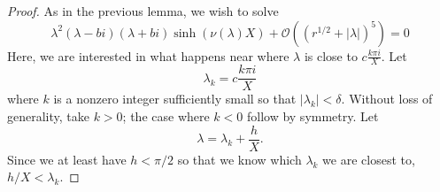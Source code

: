 \documentclass[thesis.tex]{subfiles}
\begin{document}
\begin{lemma}
\begin{proof}
As in the previous lemma, we wish to solve
\begin{equation*}
\lambda^2 ( \lambda - b i) (\lambda + b i)\sinh(\nu(\lambda)X) + \mathcal{O}( (r^{1/2} + |\lambda|)^5 ) = 0
\end{equation*}
Here, we are interested in what happens near where $\lambda$ is close to $c \frac{k \pi i}{X}$. Let 
\[
\lambda_k = c \frac{k \pi i}{X}
\]
where $k$ is a nonzero integer sufficiently small so that $|\lambda_k| < \delta$. Without loss of generality, take $k > 0$; the case where $k < 0$ follow by symmetry. Let
\[
\lambda = \lambda_k + \frac{h}{X}.
\]
Since we at least have $h < \pi/2$ so that we know which $\lambda_k$ we are closest to, $h/X < \lambda_k$.


\end{proof}
\end{lemma}
\end{document}
